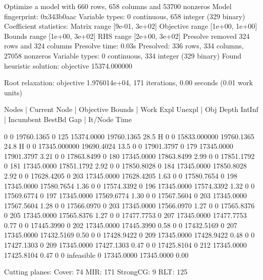 Optimize a model with 660 rows, 658 columns and 53700 nonzeros
Model fingerprint: 0x343b0aac
Variable types: 0 continuous, 658 integer (329 binary)
Coefficient statistics:
  Matrix range     [9e-01, 3e+02]
  Objective range  [1e+00, 1e+00]
  Bounds range     [1e+00, 3e+02]
  RHS range        [2e+00, 3e+02]
Presolve removed 324 rows and 324 columns
Presolve time: 0.03s
Presolved: 336 rows, 334 columns, 27058 nonzeros
Variable types: 0 continuous, 334 integer (329 binary)
Found heuristic solution: objective 15374.000000

Root relaxation: objective 1.976014e+04, 171 iterations, 0.00 seconds (0.01 work units)

    Nodes    |    Current Node    |     Objective Bounds      |     Work
 Expl Unexpl |  Obj  Depth IntInf | Incumbent    BestBd   Gap | It/Node Time

     0     0 19760.1365    0  125 15374.0000 19760.1365  28.5%
H    0     0                    15833.000000 19760.1365  24.8%
H    0     0                    17345.000000 19690.4024  13.5%
     0     0 17901.3797    0  179 17345.0000 17901.3797  3.21%
     0     0 17863.8499    0  180 17345.0000 17863.8499  2.99%
     0     0 17851.1792    0  181 17345.0000 17851.1792  2.92%
     0     0 17850.8028    0  184 17345.0000 17850.8028  2.92%
     0     0 17628.4205    0  203 17345.0000 17628.4205  1.63%
     0     0 17580.7654    0  198 17345.0000 17580.7654  1.36%
     0     0 17574.3392    0  196 17345.0000 17574.3392  1.32%
     0     0 17569.6774    0  197 17345.0000 17569.6774  1.30%
     0     0 17567.5604    0  203 17345.0000 17567.5604  1.28%
     0     0 17566.0970    0  203 17345.0000 17566.0970  1.27%
     0     0 17565.8376    0  205 17345.0000 17565.8376  1.27%
     0     0 17477.7753    0  207 17345.0000 17477.7753  0.77%
     0     0 17445.3990    0  202 17345.0000 17445.3990  0.58%
     0     0 17432.5169    0  207 17345.0000 17432.5169  0.50%
     0     0 17428.9422    0  209 17345.0000 17428.9422  0.48%
     0     0 17427.1303    0  209 17345.0000 17427.1303  0.47%
     0     0 17425.8104    0  212 17345.0000 17425.8104  0.47%
     0     0 infeasible    0      17345.0000 17345.0000  0.00%

Cutting planes:
  Cover: 74
  MIR: 171
  StrongCG: 9
  RLT: 125

